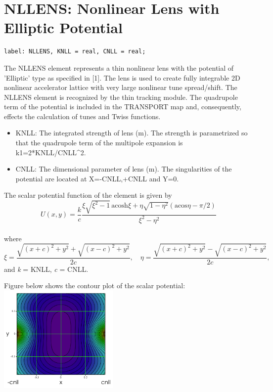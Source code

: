 
\section{NLLENS: Nonlinear Lens with Elliptic Potential}

\begin{verbatim}
label: NLLENS, KNLL = real, CNLL = real;
\end{verbatim}

The NLLENS element represents a thin nonlinear lens with the potential
of 'Elliptic' type as specified in [1]. The lens is used to create fully
integrable 2D nonlinear accelerator lattice with very large nonlinear
tune spread/shift. The NLLENS element is recognized by the thin tracking
module. The quadrupole term of the potential is included in the
TRANSPORT map and, consequently, effects the calculation of tunes and
Twiss functions.   

\begin{itemize}
   \item KNLL: The integrated strength of lens (m). The strength is
     parametrized so that     the quadrupole term of the multipole
     expansion is k1=2*KNLL/CNLL\textasciicircum2.      
   \item CNLL: The dimensional parameter of lens (m). The singularities
     of the potential are     located at X=-CNLL,+CNLL and Y=0.  
\end{itemize}

The scalar potential function of the element is given by
\\
\[
U(x,y)=\frac{k}{c}\frac{\xi\sqrt{\xi^2-1} \, \text{acosh}\xi +  
  \eta\sqrt{1-\eta^2}(\text{acos}\eta-\pi/2)}{\xi^2-\eta^2}
\]
\\ where 
\[
\xi = \frac{\sqrt{(x+c)^2+y^2}+\sqrt{(x-c)^2+y^2}}{2c}, 
\quad \eta = \frac{\sqrt{(x+c)^2+y^2}-\sqrt{(x-c)^2+y^2}}{2c},
\]
and \textit{k} = KNLL, \textit{c} = CNLL.

Figure below shows the contour plot of the scalar potential: \\
\includegraphics[width=220px]{Introduction/nllens_potential-2D.png}

